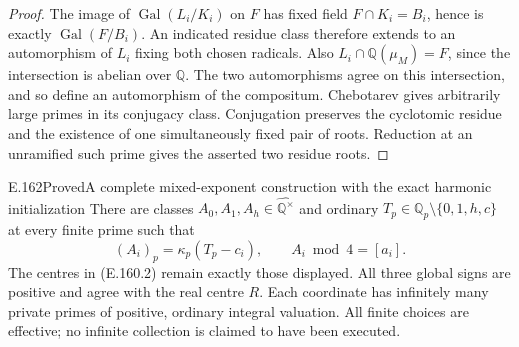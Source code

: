 \begin{proof}
The image of $\operatorname{Gal}(L_i/K_i)$ on $F$ has fixed
field $F\cap K_i=B_i$, hence is exactly
$\operatorname{Gal}(F/B_i)$.  An indicated residue class
therefore extends to an automorphism of $L_i$ fixing both
chosen radicals.  Also $L_i\cap\mathbb Q(\mu_M)=F$, since
the intersection is abelian over $\mathbb Q$.  The two
automorphisms agree on this intersection, and so define an
automorphism of the compositum.  Chebotarev
\citep[Theorem 8.31, p.~147]{CohMilneANT} gives arbitrarily
large primes in its conjugacy class.  Conjugation preserves
the cyclotomic residue and the existence of one simultaneously
fixed pair of roots.  Reduction at an unramified such prime
gives the asserted two residue roots.
\end{proof}

\begin{result}{E.162}{Proved}{A complete mixed-exponent construction with the exact harmonic initialization}
There are classes $A_0,A_1,A_h\in\widehat{\mathbb Q^\times}$
and ordinary $T_p\in\mathbb Q_p\setminus\{0,1,h,c\}$ at every
finite prime such that
\[
 (A_i)_p=\kappa_p(T_p-c_i),\qquad A_i\bmod4=[a_i].
\tag{E.162.1}
\]
The centres in (E.160.2) remain exactly those displayed.
All three global signs are positive and agree with the real
centre $R$.  Each coordinate has infinitely many private
primes of positive, ordinary integral valuation.  All finite
choices are effective; no infinite collection is claimed to
have been executed.
\end{result}
